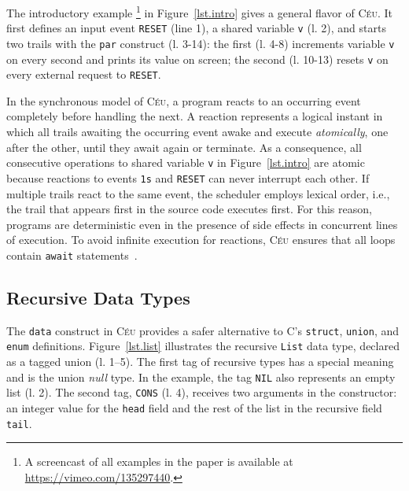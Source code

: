 \documentclass{sig-alternate}
\newcommand{\CEU}{\textsc{C\'{e}u}\xspace}
\newcommand{\code}[1] {{\small{\texttt{#1}}}}
\begin{document}

The introductory example%
\footnote{A screencast of all examples in the paper is available at 
\url{https://vimeo.com/135297440}.}
in Figure~\ref{lst.intro} gives a general flavor of \CEU.
It first defines an input event \code{RESET} (line 1), a shared variable 
\code{v} (l. 2), and starts two trails with the \code{par} construct (l. 
3-14): the first (l. 4-8) increments variable \code{v} on every second and 
prints its value on screen; the second (l. 10-13) resets \code{v} on every 
external request to \code{RESET}.

In the synchronous model of \CEU, a program reacts to an occurring event 
completely before handling the next.
%
A reaction represents a logical instant in which all trails awaiting the 
occurring event awake and execute \emph{atomically}, one after the other, until 
they await again or terminate.
%
As a consequence, all consecutive operations to shared variable \code{v} in 
Figure~\ref{lst.intro} are atomic because reactions to events \code{1s} and 
\code{RESET} can never interrupt each other.
%
If multiple trails react to the same event, the scheduler employs lexical 
order, i.e., the trail that appears first in the source code executes first.
%
For this reason, programs are deterministic even in the presence of side 
effects in concurrent lines of execution.
%
To avoid infinite execution for reactions, \CEU ensures that all loops contain 
\code{await} statements~\cite{ceu.sensys13}.

\subsection{Recursive Data Types}

The \code{data} construct in \CEU provides a safer alternative to C's
\code{struct}, \code{union}, and \code{enum} definitions.
%
Figure~\ref{lst.list} illustrates the recursive \code{List} data type,
declared as a tagged union (l. 1--5).
The first tag of recursive types has a special meaning and is the union 
\emph{null} type.
In the example, the tag \code{NIL} also represents an empty list (l. 2).
The second tag, \code{CONS} (l. 4), receives two arguments in the constructor: 
an integer value for the \code{head} field and the rest of the list in the 
recursive field \code{tail}.
\end{document}
